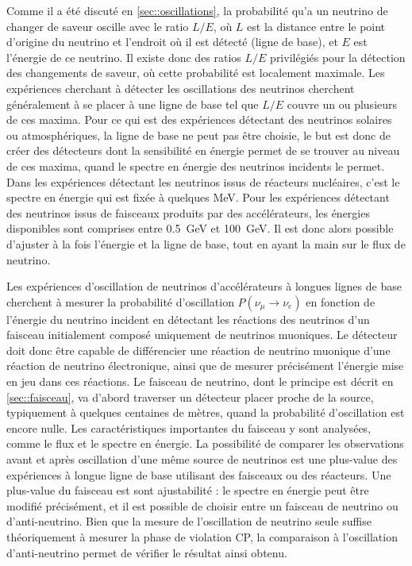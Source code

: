             Comme il a été discuté en \autoref{sec::oscillations}, la probabilité qu'a un neutrino de changer de saveur oscille avec le ratio $L/E$, où $L$ est la distance entre le point d'origine du neutrino et l'endroit où il est détecté (ligne de base), et $E$ est l'énergie de ce neutrino. Il existe donc des ratios $L/E$ privilégiés pour la détection des changements de saveur, où cette probabilité est localement maximale. Les expériences cherchant à détecter les oscillations des neutrinos cherchent généralement à se placer à une ligne de base tel que $L/E$ couvre un ou plusieurs de ces maxima. Pour ce qui est des expériences détectant des neutrinos solaires ou atmosphériques, la ligne de base ne peut pas être choisie, le but est donc de créer des détecteurs dont la sensibilité en énergie permet de se trouver au niveau de ces maxima, quand le spectre en énergie des neutrinos incidents le permet. Dans les expériences détectant les neutrinos issus de réacteurs nucléaires, c'est le spectre en énergie qui est fixée à quelques \si{\mega\electronvolt}. Pour les expériences détectant des neutrinos issus de faisceaux produits par des accélérateurs, les énergies disponibles sont comprises entre \SI{0.5}{\giga\electronvolt} et \SI{100}{\giga\electronvolt}. Il est donc alors possible d'ajuster à la fois l'énergie et la ligne de base, tout en ayant la main sur le flux de neutrino.
            
            Les expériences d'oscillation de neutrinos d'accélérateurs à longues lignes de base cherchent à mesurer la probabilité d'oscillation $P(\nu_{\mu}\to \nu_e)$ en fonction de l'énergie du neutrino incident en détectant les réactions des neutrinos d'un faisceau initialement composé uniquement de neutrinos muoniques. Le détecteur doit donc être capable de différencier une réaction de neutrino muonique d'une réaction de neutrino électronique, ainsi que de mesurer précisément l'énergie mise en jeu dans ces réactions. Le faisceau de neutrino, dont le principe est décrit en \autoref{sec::faisceau}, va d'abord traverser un détecteur placer proche de la source, typiquement à quelques centaines de mètres, quand la probabilité d'oscillation est encore nulle. Les caractéristiques importantes du faisceau y sont analysées, comme le flux et le spectre en énergie. La possibilité de comparer les observations avant et après oscillation d'une même source de neutrinos est une plus-value des expériences à longue ligne de base utilisant des faisceaux ou des réacteurs. Une plus-value du faisceau est sont ajustabilité : le spectre en énergie peut être modifié précisément, et il est possible de choisir entre un faisceau de neutrino ou d'anti-neutrino. Bien que la mesure de l'oscillation de neutrino seule suffise théoriquement à mesurer la phase de violation CP, la comparaison à l'oscillation d'anti-neutrino permet de vérifier le résultat ainsi obtenu.
            
